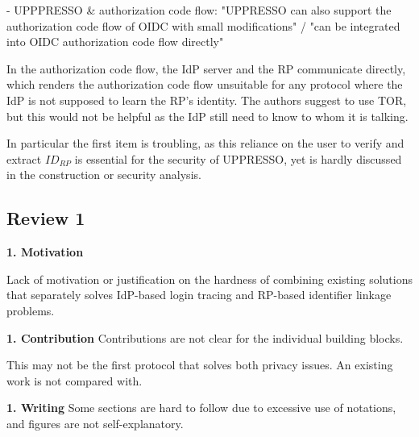 \documentclass[letterpaper,onecolumn,10pt]{article}
\begin{document}
- UPPPRESSO \& authorization code flow: "UPPRESSO can also support the authorization code flow of
OIDC with small modifications" / "can be integrated into OIDC authorization code flow directly"

In the authorization code flow, the IdP server and the RP communicate directly, which renders the authorization code flow unsuitable for any protocol where the IdP is not supposed to learn the RP's identity. The authors suggest to use TOR, but this would not be helpful as the IdP still need to know to whom it is talking.

In particular the first item is troubling, as this reliance on the user to verify and extract $ID_{RP}$ is essential for the security of UPPRESSO, yet is hardly discussed in the construction or security analysis.



\subsection*{Review 1}
\noindent\textbf{1. Motivation}

Lack of motivation or justification on the hardness of combining existing solutions that separately solves IdP-based login tracing and RP-based identifier linkage problems.

\noindent\textbf{1. Contribution}
Contributions are not clear for the individual building blocks.

This may not be the first protocol that solves both privacy issues. An existing work is not compared with.


\noindent\textbf{1. Writing}
Some sections are hard to follow due to excessive use of notations, and figures are not self-explanatory. 
\end{document}
